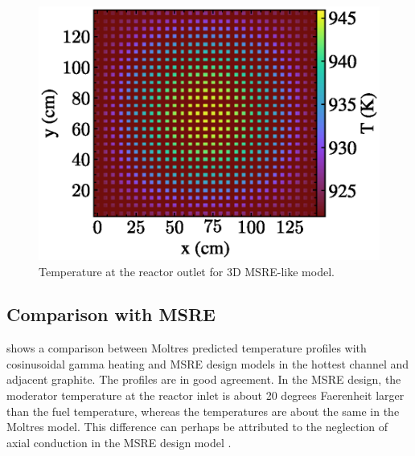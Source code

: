 \documentclass{article}
\let\Oldsubsection\subsection
\renewcommand{\subsection}{\FloatBarrier\Oldsubsection}
\begin{document}
\begin{figure}[htpb]
  \centering
  \includegraphics{3d_gamma_heating_z_slice_temp.eps}
        \caption{Temperature at the reactor outlet for 3D \gls{MSRE}-like
          model.}
  \label{fig:3d_temp_fuel_outlet}
\end{figure}



\subsection{Comparison with \gls{MSRE}}

 shows a comparison between Moltres predicted temperature
profiles with cosinusoidal gamma heating and \gls{MSRE} design models
\cite{briggs_molten-salt_1964} in the hottest channel and adjacent graphite. The
profiles are in good agreement. In the \gls{MSRE} design, the moderator
temperature at the reactor inlet is about 20 degrees Faerenheit larger than the
fuel temperature, whereas the temperatures are about the same in the Moltres
model. This difference can perhaps be attributed to the neglection of axial
conduction in the \gls{MSRE} design model \cite[p. 99]{briggs_molten-salt_1964}.
\end{document}

